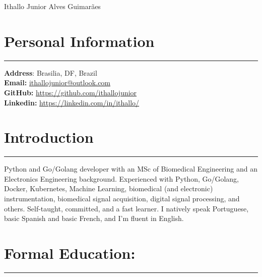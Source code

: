 \documentclass[11pt]{article}
\begin{document}

\begin{center}
\huge{Ithallo Junior Alves Guimarães}
\end{center}


\section{Personal Information}
\hrule \vspace{0.1cm}
\begin{addmargin}{0.5cm}
\textbf{Address}: Brasilia, DF, Brazil \\
\textbf{Email:}   \href{maito:ithallojunior@outlook.com}{ithallojunior@outlook.com} \\
\textbf{GitHub:} \url{https://github.com/ithallojunior} \\
\textbf{Linkedin:} \url{https://linkedin.com/in/ithallo/}
\end{addmargin}


\section{Introduction}
\hrule \vspace{0.1cm}

\begin{addmargin}{0.5cm}
Python  and Go/Golang developer with an MSc of Biomedical Engineering and an Electronics Engineering background.
Experienced with Python, Go/Golang, Docker, Kubernetes, Machine Learning, 
biomedical (and electronic) instrumentation, biomedical signal 
acquisition, digital signal processing, and others. Self-taught, committed, and a fast learner. I natively speak Portuguese,
basic Spanish and basic French, and I'm fluent in English.
\end{addmargin}


\section{Formal Education:}
\hrule \vspace{0.1cm}
\end{document}
